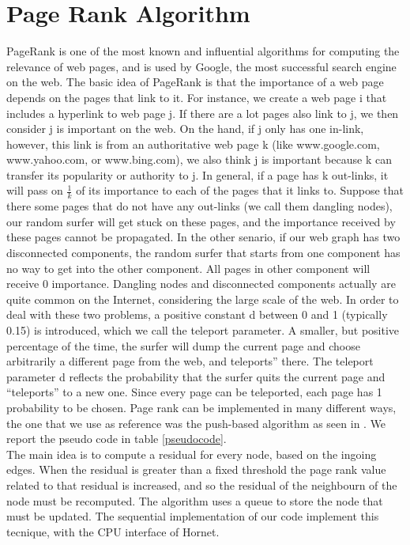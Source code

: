 \documentclass[journal]{IEEEtran}
\begin{document}
\section{Page Rank Algorithm}
PageRank is one of the most known and influential algorithms for computing the
relevance of web pages, and is used by Google, the most successful search
engine on the web. The basic idea of PageRank is that the importance of a web
page depends on the pages that link to it. For instance, we create a web page i
that includes a hyperlink to web page j. If there are a lot pages also link to
j, we then consider j is important on the web. On the hand, if j only has one
in-link, however, this link is from an authoritative web page k (like
www.google.com, www.yahoo.com, or www.bing.com), we also think j is important
because k can transfer its popularity or authority to j.
In general, if a page has k out-links, it will pass on ${\frac{1}{k}}$ of its
importance to each of the pages that it links to.
Suppose that there some pages that do not have any
out-links (we call them dangling nodes), our random surfer will get stuck on
these pages, and the importance received by these pages cannot be propagated.
In the other senario, if our web graph has two disconnected components, the
random surfer that starts from one component has no way to get into the other
component. All pages in other component will receive 0
importance.  Dangling nodes and disconnected components actually are quite
common on the Internet, considering the large scale of the web. In order to
deal with these two problems, a positive constant d between 0 and 1 (typically
0.15) is introduced, which we call the teleport parameter.
A smaller, but positive percentage of the time, the surfer will dump the
current page and choose arbitrarily a different page from the web, and 
teleports” there. The teleport parameter d reflects the probability that the
surfer quits the current page and “teleports” to a new one. Since every page
can be teleported, each page has 1 probability to be chosen.
Page rank can be implemented in many different ways, the one that we use as
reference was the push-based algorithm as seen in \cite{PR}.
We report the pseudo code in table \ref{pseudocode}.\\
The main idea is to compute a residual for every node, based on the ingoing
edges. When the residual is greater than a fixed threshold the
page rank value related to that residual is increased, and so the residual of
the neighbourn of the node must be recomputed. The algorithm uses a queue to
store the node that must be updated.
The sequential implementation of our code implement this tecnique, with the
CPU interface of Hornet.
\end{document}
